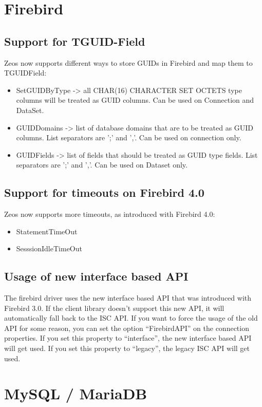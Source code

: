 \documentclass[a4paper,12pt,oneside]{article}
\begin{document}
\section{Firebird}

\subsection{Support for TGUID-Field}
Zeos now supports different ways to store GUIDs in Firebird and map them to TGUIDField:
\begin{itemize}
  \item SetGUIDByType -> all CHAR(16) CHARACTER SET OCTETS type columns will be treated as GUID columns. Can be used on Connection and DataSet.
  \item GUIDDomains -> list of database domains that are to be treated as GUID columns. List separators are ';' and ','. Can be used on connection only.
  \item GUIDFields -> list of fields that should be treated as GUID type fields. List separators are ';' and ','. Can be used on Dataset only.
\end{itemize}

\subsection{Support for timeouts on Firebird 4.0}
Zeos now supports more timeouts, as introduced with Firebird 4.0:
\begin{itemize}
  \item StatementTimeOut
  \item SesssionIdleTimeOut
\end{itemize}

\subsection{Usage of new interface based API}
The firebird driver uses the new interface based API that was introduced with Firebird 3.0.
If the client library doesn't support this new API, it will automatically fall back to the ISC API.
If you want to force the usage of the old API for some reason, you can set the option "`FirebirdAPI"' on the connection properties.
If you set this property to "`interface"', the new interface based API will get used.
If you set this property to "`legacy"', the legacy ISC API will get used.

\section{MySQL / MariaDB}
\end{document}
